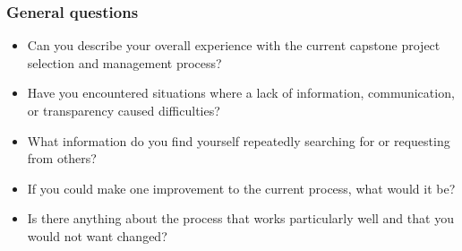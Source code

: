 \documentclass{article}
\begin{document}
    \subsubsection*{General questions}
    \begin{itemize}
        \item Can you describe your overall experience with the current capstone project selection and management process?
        \item Have you encountered situations where a lack of information, communication, or transparency caused difficulties?
        \item What information do you find yourself repeatedly searching for or requesting from others?
        \item If you could make one improvement to the current process, what would it be?
        \item Is there anything about the process that works particularly well and that you would not want changed?
    \end{itemize}
\end{document}
